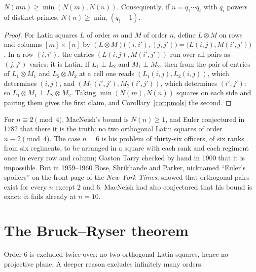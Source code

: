 \begin{proposition}[MacNeish, 1922]\label{prop:macneish}
$N(mn)\ge\min(N(m),N(n))$. Consequently, if $n=q_1\cdots q_t$ with $q_i$ powers of distinct primes, $N(n)\ge\min_i(q_i-1)$.
\end{proposition}
\begin{proof}
For Latin squares $L$ of order $m$ and $M$ of order $n$, define $L\otimes M$ on rows and columns $[m]\times[n]$ by $(L\otimes M)\bigl((i,i'),(j,j')\bigr)=\bigl(L(i,j),M(i',j')\bigr)$. In a row $(i,i')$, the entries
$(L(i,j),M(i',j'))$ run over all pairs as $(j,j')$ varies: it is Latin. If $L_1\perp L_2$ and $M_1\perp M_2$, then from the pair of entries of $L_1\otimes M_1$ and $L_2\otimes M_2$ at a cell one reads
$(L_1(i,j),L_2(i,j))$, which determines $(i,j)$, and $(M_1(i',j'),M_2(i',j'))$, which determines $(i',j')$: so $L_1\otimes M_1\perp L_2\otimes M_2$. Taking $\min(N(m),N(n))$ squares on each side
and pairing them gives the first claim, and Corollary~\ref{cor:pmols} the second.
\end{proof}

For $n\equiv2\pmod4$, MacNeish's bound is $N(n)\ge1$, and Euler conjectured in 1782 that there it is the truth: no two orthogonal Latin squares of order $n\equiv2\pmod 4$. The case $n=6$ is his
problem of thirty-six officers, of six ranks from six regiments, to be arranged in a square with each rank and each regiment once in every row and column; Gaston Tarry checked by hand in
1900 that it is impossible. But in 1959--1960 Bose, Shrikhande and Parker, nicknamed ``Euler's spoilers'' on the front page of the \emph{New York Times}, showed that orthogonal pairs exist
for every $n$ except $2$ and $6$. MacNeish had also conjectured that his bound is exact; it fails already at $n=10$.

\section{The Bruck--Ryser theorem}

Order $6$ is excluded twice over: no two orthogonal Latin squares, hence no projective plane. A deeper reason excludes infinitely many orders.

